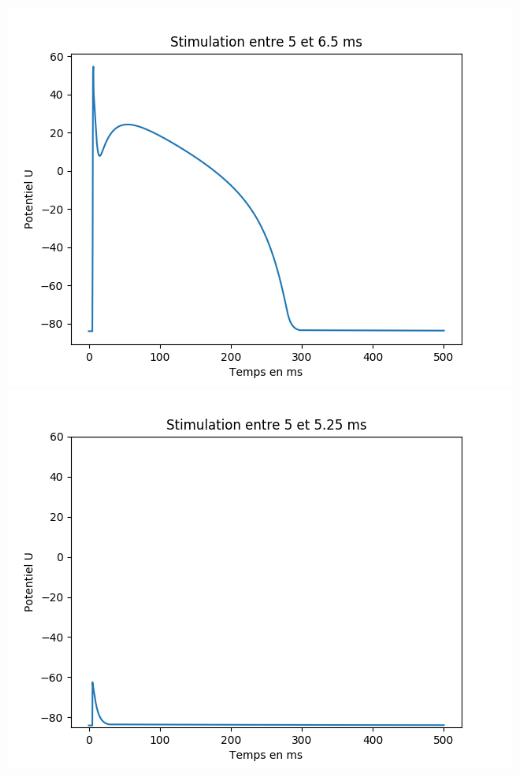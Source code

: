 \documentclass[a4paper,12pt,twoside]{report}
\begin{document}
\includegraphics[scale=0.5]{./u(t).png}\\
\includegraphics[scale=0.5]{./u(t)_2.png}\\
\end{document}
